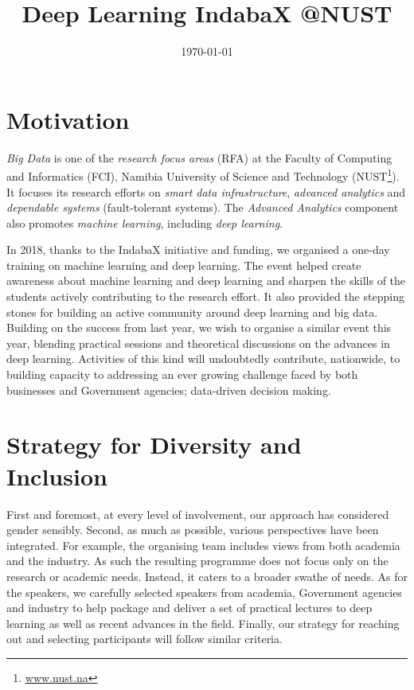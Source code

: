 \documentclass[10pt]{article}
\title{Deep Learning IndabaX @NUST}
\author{}
\date{\today}
\begin{document}
\maketitle


\section{Motivation}
\label{sec:motivation}

\emph{Big Data} is one of the \emph{research focus areas} (RFA) at the Faculty of Computing and Informatics (FCI), Namibia University of Science and Technology (NUST\footnote{\url{www.nust.na}}). It focuses its research efforts on \emph{smart data infrastructure}, \emph{advanced analytics} and \emph{dependable systems} (fault-tolerant systems). The \emph{Advanced Analytics} component also promotes \emph{machine learning}, including \emph{deep learning}.

In 2018, thanks to the IndabaX initiative and funding, we organised a one-day training on machine learning and deep learning. The event helped create awareness about machine learning and deep learning and sharpen the skills of the students actively contributing to the research effort. It also provided the stepping stones for building an active community around deep learning and big data. Building on the success from last year, we wish to organise a similar event this year, blending practical sessions and theoretical discussions on the advances in deep learning. Activities of this kind will undoubtedly contribute, nationwide, to building capacity to addressing an ever growing
challenge faced by both businesses and Government agencies; data-driven decision making.

\section{Strategy for Diversity and Inclusion}
\label{sec:diversity-and-inclusion}

First and foremost, at every level of involvement, our approach has considered gender sensibly. Second, as much as possible, various perspectives have been
integrated. For example, the organising team includes views from both academia and the industry. As such the resulting programme does not focus only on the
research or academic needs. Instead, it caters to a broader swathe of needs. As for the speakers, we carefully selected speakers from academia,
Government agencies and industry to help package and deliver a set of practical lectures to deep learning as well as recent advances in the field. Finally, our strategy for reaching out
and selecting participants will follow similar criteria.
\end{document}
